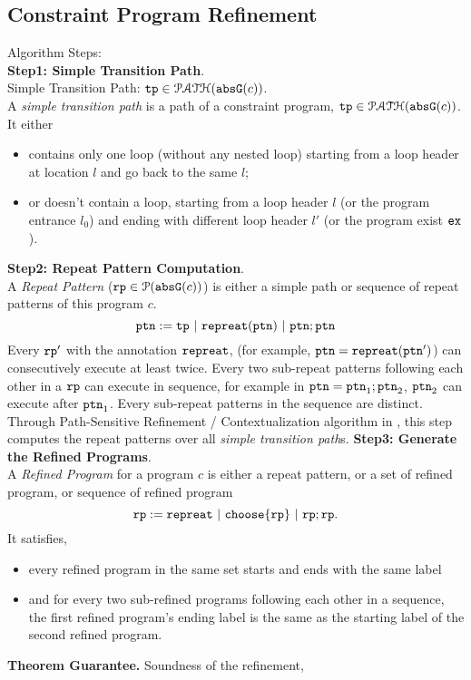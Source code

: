 \subsection{Constraint Program Refinement}
\label{sec:refine}
Algorithm Steps:
\\
\textbf{Step1: Simple Transition Path}.
\\
% 
Simple Transition Path: ${\mathtt{tp}} \in \mathcal{PATH}({\mathtt{abs}}{{\mathtt{G}}}(c))$.
\\
A \emph{simple transition path} is a path of a constraint program, ${\mathtt{tp}} \in \mathcal{PATH}({\mathtt{abs}}{{\mathtt{G}}}(c))$.
It either
\begin{itemize}
  \item contains only one loop (without any nested loop) starting from a loop header at location $l$ and go back to the same $l$;
  \item or doesn't contain a loop, starting from a loop header $l$ (or the program entrance $l_0$)
and ending with different loop header $l'$ (or the program exist ${\mathtt{ex}}$).
\end{itemize}
%
\textbf{Step2: Repeat Pattern Computation}.
\\
A \emph{Repeat Pattern} (${\mathtt{rp}} \in \mathcal{P}({{\mathtt{abs}}{{\mathtt{G}}}(c)})$) is either a simple path or sequence of repeat patterns of this program $c$. 
\[
  {\mathtt{ptn}} := {\mathtt{tp}} ~|~ {\mathtt{repreat}}({\mathtt{ptn}}) ~|~ {\mathtt{ptn}}; {\mathtt{ptn}}
\]
Every ${\mathtt{rp}}'$ with the annotation ${\mathtt{repreat}}$, (for example, ${\mathtt{ptn}} = {\mathtt{repreat}}({\mathtt{ptn}}')$)
can consecutively execute at least twice.
Every two sub-repeat patterns following each other in a ${\mathtt{rp}}$ can execute in sequence, for example in ${\mathtt{ptn}} = {\mathtt{ptn}}_1; {\mathtt{ptn}}_2$,
${\mathtt{ptn}}_2$ can execute after ${\mathtt{ptn}}_1$.
Every sub-repeat patterns in the sequence are distinct.
 \\
Through Path-Sensitive Refinement / Contextualization algorithm in \cite{GulwaniJK09, ZulegerGSV11},
this step computes the repeat patterns over all \emph{simple transition path}s.
\textbf{Step3: Generate the Refined Programs}.
\\
A \emph{Refined Program} for a program $c$
is either a repeat pattern, or a set of refined program, or sequence of refined program
\[
  \rprog :=  \rprepeat ~|~ \rpchoose{\rprog} ~|~ \rprog; \rprog.
\]
It satisfies,
\begin{itemize}
  \item every refined program in the same set starts and ends with the same label
  \item and for every two sub-refined programs following each other in a sequence,
    the first refined program's ending label is the same 
    as the starting label of the second refined program.
\end{itemize}
%
\textbf{Theorem Guarantee.}
Soundness of the refinement,
